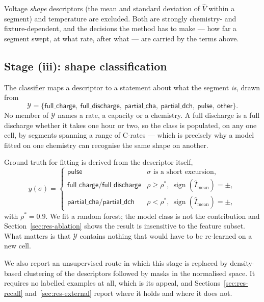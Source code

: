 \documentclass[preprint,3p,number]{elsarticle}
\begin{document}
Voltage \emph{shape} descriptors (the mean and standard deviation of $\hat{V}$
within a segment) and temperature are excluded. Both are strongly
chemistry- and fixture-dependent, and the decisions the method has to make ---
how far a segment swept, at what rate, after what --- are carried by the terms
above.

\subsection{Stage (iii): shape classification}
\label{sec:labelling}

The classifier maps a descriptor to a statement about what the segment
\emph{is}, drawn from
\begin{equation}
\mathcal{Y} = \{\textsf{full\_charge},\ \textsf{full\_discharge},\
\textsf{partial\_cha},\ \textsf{partial\_dch},\ \textsf{pulse},\ \textsf{other}\}.
\label{eq:shapes}
\end{equation}
No member of $\mathcal{Y}$ names a rate, a capacity or a chemistry. A full
discharge is a full discharge whether it takes one hour or two, so the class is
populated, on any one cell, by segments spanning a range of C-rates --- which is
precisely why a model fitted on one chemistry can recognise the same shape on
another.

Ground truth for fitting is derived from the descriptor itself,
\begin{equation}
y(\sigma) =
\begin{cases}
\textsf{pulse} & \sigma \text{ is a short excursion},\\
\textsf{full\_charge} / \textsf{full\_discharge}
  & \rho \ge \rho^{*},\ \operatorname{sign}(\hat{I}_{\text{mean}}) = \pm,\\
\textsf{partial\_cha} / \textsf{partial\_dch}
  & \rho < \rho^{*},\ \operatorname{sign}(\hat{I}_{\text{mean}}) = \pm,
\end{cases}
\label{eq:shapelabel}
\end{equation}
with $\rho^{*} = 0.9$. We fit a random forest; the model class is not the
contribution and Section~\ref{sec:res-ablation} shows the result is insensitive
to the feature subset. What matters is that $\mathcal{Y}$ contains nothing that
would have to be re-learned on a new cell.

We also report an unsupervised route in which this stage is replaced by
density-based clustering of the descriptors followed by masks in the normalised
space. It requires no labelled examples at all, which is its appeal, and
Sections~\ref{sec:res-recall} and~\ref{sec:res-external} report where it holds
and where it does not.
\end{document}
